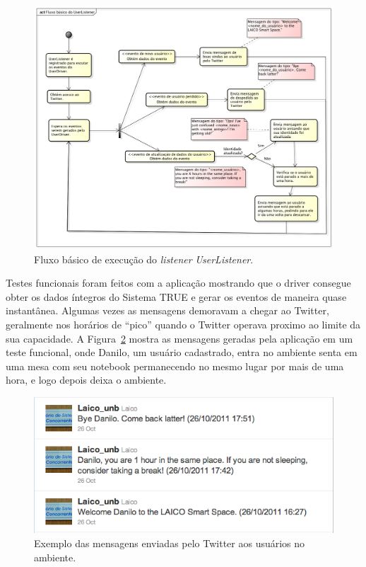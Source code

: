 	\begin{figure}[hbt]
		\begin{center}
			\includegraphics[scale=0.45]{figuras/5.Testes/diagrama-user-tweet.png}
		\end{center}
		\caption{Fluxo básico de execução do \textit{listener} \textit{UserListener}.}
		\label{fig:diagrama-tweet}
	\end{figure}

	Testes funcionais foram feitos com a aplicação mostrando que o driver consegue
	obter os dados íntegros do Sistema TRUE e gerar os eventos de maneira quase
	instantânea. Algumas vezes as mensagens demoravam a chegar ao Twitter,
	geralmente nos horários de ``pico'' quando o Twitter operava proximo ao limite
	da sua capacidade. A Figura~\ref{fig:tweets} mostra as mensagens geradas
	pela aplicação em um teste funcional, onde Danilo, um usuário cadastrado,
	entra no ambiente senta em uma mesa com seu notebook permanecendo no mesmo
	lugar por mais de uma hora, e logo depois deixa o ambiente.

	\begin{figure}[hbt]
			\begin{center}
				\includegraphics[scale=0.6]{figuras/5.Testes/tweets.png}
			\end{center}
			\caption{Exemplo das mensagens enviadas pelo Twitter aos usuários no ambiente.}
			\label{fig:tweets}
		\end{figure}	